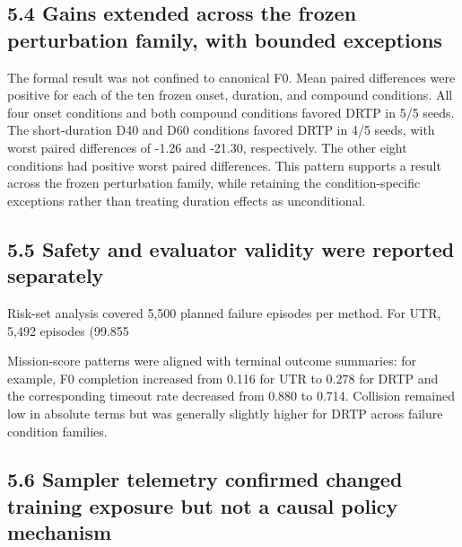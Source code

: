 {{{{{{{{{{{{\subsection{5.4 Gains extended across the frozen perturbation family, with bounded exceptions}

The formal result was not confined to canonical F0. Mean paired differences were positive for each of the ten frozen onset, duration, and compound conditions. All four onset conditions and both compound conditions favored DRTP in 5/5 seeds. The short-duration D40 and D60 conditions favored DRTP in 4/5 seeds, with worst paired differences of -1.26 and -21.30, respectively. The other eight conditions had positive worst paired differences. This pattern supports a result across the frozen perturbation family, while retaining the condition-specific exceptions rather than treating duration effects as unconditional.

\subsection{5.5 Safety and evaluator validity were reported separately}

Risk-set analysis covered 5,500 planned failure episodes per method. For UTR, 5,492 episodes (99.855%

Mission-score patterns were aligned with terminal outcome summaries: for example, F0 completion increased from 0.116 for UTR to 0.278 for DRTP and the corresponding timeout rate decreased from 0.880 to 0.714. Collision remained low in absolute terms but was generally slightly higher for DRTP across failure condition families.

\subsection{5.6 Sampler telemetry confirmed changed training exposure but not a causal policy mechanism}

}}}}}}}}}}}}
